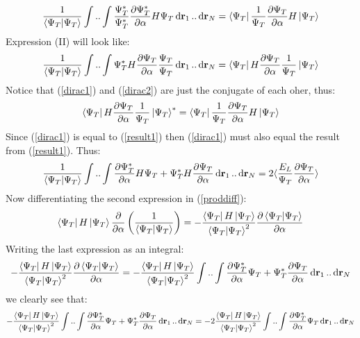 \documentclass[a4paper, 10pt]{article}
\begin{document}
\begin{appendices}
\begin{align}
		\frac{1}{\braket{\Psi_{T}}}\int..\int \frac{\Psi_{T}^{*}}{\Psi_{T}^{*}}\pdv{\Psi_{T}^{*}}{\alpha}H\Psi_{T}\dd{\bold{r}_{1}}..\dd{\bold{r}_{N}}
		= \bra{\Psi_{T}}\frac{1}{\Psi_{T}}\pdv{\Psi_{T}}{\alpha}H\ket{\Psi_{T}}
		\label{dirac1}
		\end{align}
		Expression (II) will look like:
		\begin{align}
		\frac{1}{\braket{\Psi_{T}}}\int..\int\Psi_{T}^{*}H\pdv{\Psi_{T}}{\alpha}\frac{\Psi_{T}}{\Psi_{T}}\dd{\bold{r}_{1}}..\dd{\bold{r}_{N}}
		= \bra{\Psi_{T}}H\pdv{\Psi_{T}}{\alpha}\frac{1}{\Psi_{T}}\ket{\Psi_{T}}
		\label{dirac2}
		\end{align}
		Notice that (\ref{dirac1}) and (\ref{dirac2}) are just the conjugate of each oher, thus:
		\begin{align}
		\bra{\Psi_{T}}H\pdv{\Psi_{T}}{\alpha}\frac{1}{\Psi_{T}}\ket{\Psi_{T}}^{*}
		=
		\bra{\Psi_{T}}\frac{1}{\Psi_{T}}\pdv{\Psi_{T}}{\alpha}H\ket{\Psi_{T}}
		\end{align}
		Since (\ref{dirac1}) is equal to (\ref{result1}) then (\ref{dirac1}) must also equal the result from
		(\ref{result1}). Thus:
		\begin{align}
		\frac{1}{\braket{\Psi_{T}}}\int..\int\pdv{\Psi_{T}^{*}}{\alpha}H\Psi_{T}
		+   \Psi_{T}^{*}H\pdv{\Psi_{T}}{\alpha}\dd{\bold{r}_{1}}..\dd{\bold{r}_{N}}
		= 2 \langle \frac{E_{L}}{\Psi_{T}}\pdv{\Psi_{T}}{\alpha} \rangle
		\end{align}
		Now differentiating the second expression in (\ref{proddiff}):
		\begin{align}
		\bra{\Psi_{T}}H\ket{\Psi_{T}}\pdv{\alpha}\left(\frac{1}{\braket{\Psi_{T}}}\right)
		= -\frac{\bra{\Psi_{T}}H\ket{\Psi_{T}}}{\braket{\Psi_{T}}^{2}}\pdv{\braket{\Psi_{T}}}{\alpha}
		\end{align}
		Writing the last expression as an integral:
		\begin{align}
		-\frac{\bra{\Psi_{T}}H\ket{\Psi_{T}}}{\braket{\Psi_{T}}^{2}}\pdv{\braket{\Psi_{T}}}{\alpha}
		= -\frac{\bra{\Psi_{T}}H\ket{\Psi_{T}}}{\braket{\Psi_{T}}^{2}}\int..\int \pdv{\Psi_{T}^{*}}{\alpha}\Psi_{T} +
		\Psi_{T}^{*}\pdv{\Psi_{T}}{\alpha}\dd{\bold{r}_{1}}..\dd{\bold{r}_{N}}
		\end{align}
		we clearly see that:
		\begin{align}
		-\frac{\bra{\Psi_{T}}H\ket{\Psi_{T}}}{\braket{\Psi_{T}}^{2}}\int..\int \pdv{\Psi_{T}^{*}}{\alpha}\Psi_{T}
		+
		\Psi_{T}^{*}\pdv{\Psi_{T}}{\alpha}\dd{\bold{r}_{1}}..\dd{\bold{r}_{N}}
		=
		-2\frac{\bra{\Psi_{T}}H\ket{\Psi_{T}}}{\braket{\Psi_{T}}^{2}}\int..\int \pdv{\Psi_{T}^{*}}{\alpha}\Psi_{T}\dd{\bold{r}_{1}}..\dd{\bold{r}_{N}}

\end{align}
\end{appendices}
\end{document}
